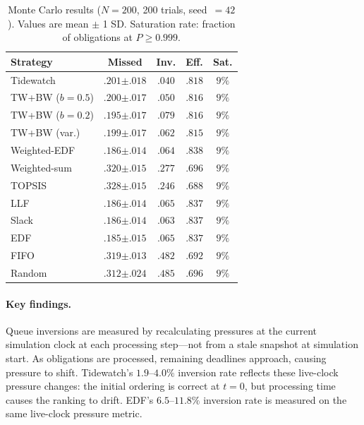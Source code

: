 \documentclass[11pt]{article}
\begin{document}
\begin{table}[t]
\centering
\caption{Monte Carlo results ($N{=}200$, 200 trials, seed~$= 42$).
Values are mean $\pm$ 1 SD.  Saturation rate:
fraction of obligations at $P \geq 0.999$.}
\label{tab:mc200}
\begin{tabular}{@{}lcccc@{}}
\toprule
\textbf{Strategy} & \textbf{Missed} & \textbf{Inv.} &
  \textbf{Eff.} & \textbf{Sat.} \\
\midrule
Tidewatch           & $.201 {\scriptstyle\pm .018}$ & $.040$ & $.818$ & $9\%$ \\
TW+BW ($b{=}0.5$)  & $.200 {\scriptstyle\pm .017}$ & $.050$ & $.816$ & $9\%$ \\
TW+BW ($b{=}0.2$)  & $.195 {\scriptstyle\pm .017}$ & $.079$ & $.816$ & $9\%$ \\
TW+BW (var.)        & $.199 {\scriptstyle\pm .017}$ & $.062$ & $.815$ & $9\%$ \\
Weighted-EDF        & $.186 {\scriptstyle\pm .014}$ & $.064$ & $.838$ & $9\%$ \\
Weighted-sum        & $.320 {\scriptstyle\pm .015}$ & $.277$ & $.696$ & $9\%$ \\
TOPSIS              & $.328 {\scriptstyle\pm .015}$ & $.246$ & $.688$ & $9\%$ \\
LLF                 & $.186 {\scriptstyle\pm .014}$ & $.065$ & $.837$ & $9\%$ \\
Slack               & $.186 {\scriptstyle\pm .014}$ & $.063$ & $.837$ & $9\%$ \\
EDF                 & $\mathbf{.185} {\scriptstyle\pm .015}$ & $.065$ & $\mathbf{.837}$ & $9\%$ \\
FIFO                & $.319 {\scriptstyle\pm .013}$ & $.482$ & $.692$ & $9\%$ \\
Random              & $.312 {\scriptstyle\pm .024}$ & $.485$ & $.696$ & $9\%$ \\
\bottomrule
\end{tabular}
\end{table}

\paragraph{Key findings.}
Queue inversions are measured by recalculating pressures at the
current simulation clock at each processing step---not from a stale
snapshot at simulation start.  As obligations are processed, remaining
deadlines approach, causing pressure to shift.  Tidewatch's
$1.9$--$4.0\%$ inversion rate reflects these live-clock pressure
changes: the initial ordering is correct at $t{=}0$, but processing
time causes the ranking to drift.  EDF's $6.5$--$11.8\%$ inversion
rate is measured on the same live-clock pressure metric.
\end{document}
